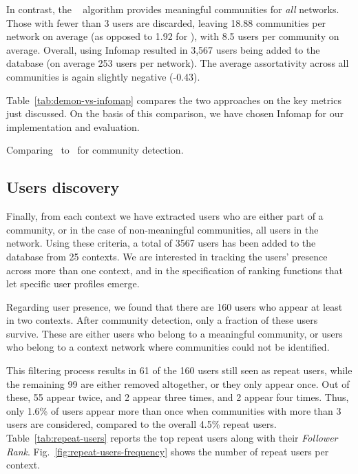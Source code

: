 In contrast, the \infomap~ algorithm provides meaningful communities for \textit{all} networks.
Those with fewer than 3 users are discarded, leaving  18.88 communities per network on average (as opposed to 1.92 for \demon), with 8.5 users per community on average.
Overall, using Infomap resulted in 3,567 users being added to the database (on average 253 users per network).
The average assortativity across all communities is again slightly negative (-0.43).

Table~\ref{tab:demon-vs-infomap} compares the two approaches on the key metrics just discussed. On the basis of this comparison, we have chosen Infomap for  our implementation and evaluation.

\begin{table}
	\resizebox{\textwidth}{!}{
	    
	}
	\caption{Comparing \demon~to \infomap~for community detection.}
	\label{tab:demon-vs-infomap}
\end{table}

\subsection{Users discovery}  \label{sec:users}

Finally, from each context we have extracted users who are either part of a community, or in the case of non-meaningful communities, all users in the network.
Using these criteria, a total of 3567 users has been added to the database from 25 contexts.
We are interested in tracking the users' presence across more than one context, and in the specification of ranking functions that let specific user profiles emerge.

Regarding user presence, we found that there are 160 users who appear at least in two contexts. 
After community detection, only a fraction of these users survive. 
These are either users who belong to a meaningful community, or users who belong to a context network where communities could not be identified.

This filtering process results in 61 of the 160 users still seen as repeat users, while the remaining 99 are either removed altogether, or they only appear once. 
Out of these, 55 appear twice, and 2 appear three times, and 2 appear four times. 
Thus, only 1.6\% of users appear more than once when communities with more than 3 users are considered, compared to the overall 4.5\% repeat users.
%
Table~\ref{tab:repeat-users} reports the top repeat users along with their \textit{Follower Rank}.  
%
Fig.~\ref{fig:repeat-users-frequency} shows the number of repeat users per context. 

